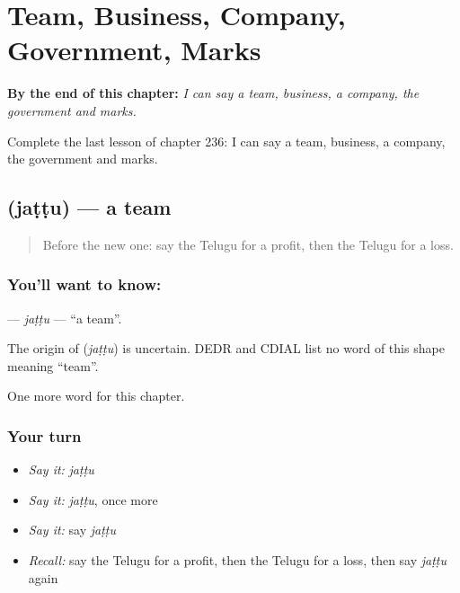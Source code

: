 
\chapter{Team, Business, Company, Government, Marks}
\label{ch:te-team-business-company-government-marks}

\begin{chapteropening}
\textbf{By the end of this chapter:} \emph{I can say a team, business, a company, the government and marks.}

Complete the last lesson of chapter 236: I can say a team, business, a company, the government and marks.
\end{chapteropening}

\section[\texorpdfstring{\te{జట్టు} (jaṭṭu)}{జట్టు (jaṭṭu)}]{ (jaṭṭu) — a team}

\label{lesson:TE-C236-jattu}



\begin{quote}
Before the new one: say the Telugu for a profit, then the Telugu for a loss.
\end{quote}

\subsection*{You'll want to know: }
\textbf{} — \emph{jaṭṭu} — \textquotedblleft{}a team\textquotedblright{}.

\begin{cousinweb}
The origin of \textbf{} (\emph{jaṭṭu}) is uncertain. DEDR and CDIAL list no word of this shape meaning \textquotedblleft{}team\textquotedblright{}.
\end{cousinweb}

\begin{grammarlens}[title={What you've built}]
One more word for this chapter.
\end{grammarlens}

\subsection*{Your turn}
\begin{itemize}
\raggedright
  \item \emph{Say it:} \emph{jaṭṭu}
  \item \emph{Say it:} \emph{jaṭṭu}, once more
  \item \emph{Say it:} say \emph{jaṭṭu}
  \item \emph{Recall:} say the Telugu for a profit, then the Telugu for a loss, then say \emph{jaṭṭu} again
\end{itemize}

